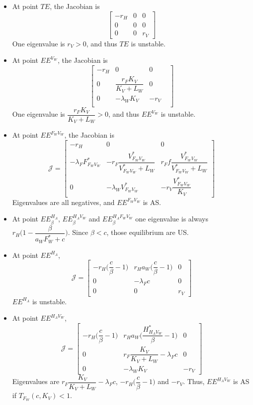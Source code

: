 \documentclass{article}
\newcommand{\lfw}{\lambda_{F}}
\newcommand{\lfv}{\lambda_{W}}
\begin{document}
\begin{itemize}
\item At point $TE$, the Jacobian is
$$
\begin{bmatrix}
-r_H & 0 & 0 \\
0 & 0 & 0  \\
0 & 0 & r_V
\end{bmatrix}
$$
One eigenvalue is $r_V > 0$, and thus $TE$ is unstable.

\item At point $EE^{V_W}$, the Jacobian is
$$
\begin{bmatrix}
-r_H & 0 & 0 \\
0 & \dfrac{r_F K_V}{K_V + L_W} & 0 \\
0  & - \lfv K_V & -r_V & \\
\end{bmatrix}
$$
One eigenvalue is $\dfrac{r_F K_V}{K_V + L_W} > 0$, and thus $EE^{V_W}$ is unstable.

\item At point $EE^{F_WV_W}$, the Jacobian is
$$
\mathcal{J} =
\begin{bmatrix}
-r_H & 0 & 0 \\
-\lfw F_{F_WV_W}^* & -r_F \dfrac{V_{F_WV_W}^*}{V_{F_WV_W}^* +L_W}  & r_F f \dfrac{V_{F_WV_W}^*}{V_{F_WV_W}^* + L_W}\\
0 & - \lfv V_{F_WV_W}^* & -r_V \dfrac{V_{F_WV_W}^*}{K_V}
\end{bmatrix}
$$
Eigenvalues are all negatives, and $EE^{F_WV_W}$ is AS.

\item At point $EE^{H_A}_\beta$, $EE^{H_AV_W}_\beta$ and $EE^{H_AF_WV_W}_\beta$ one eigenvalue is always $r_H \Big(1 - \dfrac{\beta}{a_W F_W^* + c}\Big)$. Since $\beta < c$, those equilibrium are US.

\item At point $EE^{H_A}$,
\begin{equation}
\mathcal{J} =
\begin{bmatrix}
-r_H \Big(\dfrac{c}{\beta}-1\Big) & r_H a_W \Big(\dfrac{c}{\beta}-1\Big) & 0 \\
0 & -\lfw c  & 0 \\
0 & 0 & r_V
\end{bmatrix}
\end{equation}
$EE^{H_A}$ is unstable.


\item At point $EE^{H_AV_W}$,
\begin{equation}
\mathcal{J} =
\begin{bmatrix}
-r_H \Big(\dfrac{c}{\beta}-1\Big) & r_H a_W \Big(\dfrac{H^*_{H_AV_W}}{\beta}-1\Big) & 0 \\
0 & r_F \dfrac{K_V}{K_V + L_W}-\lfw c  & 0 \\
0 & -\lfv K_V & -r_V 
\end{bmatrix}
\end{equation}
Eigenvalues are $r_F\dfrac{K_V}{K_V + L_W}-\lfw c$, $-r_H\Big(\dfrac{c}{\beta}-1\Big)$ and $-r_V$. Thus,  $EE^{H_AV_W}$ is AS if $T_{F_W}(c, K_V) < 1$.


\end{itemize}
\end{document}
